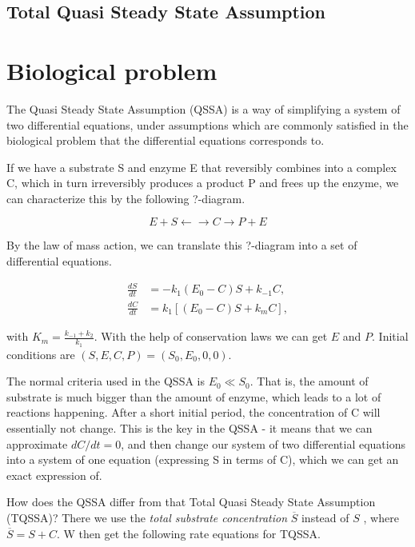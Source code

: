 \documentclass[12pt]{report}
\begin{document}
\subsection{Total Quasi Steady State Assumption}

\section{Biological problem}

The Quasi Steady State Assumption (QSSA) is a way of simplifying a system of two differential equations, under assumptions which are commonly satisfied in the biological problem that the differential equations corresponds to.

If we have a substrate S and enzyme E that reversibly combines into a complex C, which in turn irreversibly produces a product P and frees up the enzyme, we can characterize this by the following ?-diagram.

\begin{equation}
E + S \leftarrow \rightarrow C \rightarrow P + E
\end{equation}

By the law of mass action, we can translate this ?-diagram into a set of differential equations.

\begin{align*}
\frac{dS}{dt} &= -k_1(E_0-C)S + k_{-1}C, \\
\frac{dC}{dt} &= k_1[(E_0-C)S + k_mC],
\end{align*}

with $K_m = \frac{k_{-1}+k_2}{k_1}$. With the help of conservation laws we can get $E$ and $P$. Initial conditions are $(S, E, C, P) = (S_0, E_0, 0, 0)$.

The normal criteria used in the QSSA is $ E_0 \ll S_0 $. That is, the amount of substrate is much bigger than the amount of enzyme, which leads to a lot of reactions happening. After a short initial period, the concentration of C will essentially not change. This is the key in the QSSA - it means that we can approximate $dC/dt=0$, and then change our system of two differential equations into a system of one equation (expressing S in terms of C), which we can get an exact expression of.

How does the QSSA differ from that Total Quasi Steady State Assumption (TQSSA)? There we use the \textit{total substrate concentration} $\overline{S}$ instead of $S$ \cite{Borghans}, where $\overline{S} = S + C$. W then get the following rate equations for TQSSA.
\end{document}
